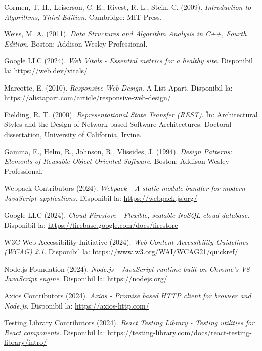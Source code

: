 \documentclass[12pt,a4paper]{report}
\begin{document}
\begin{thebibliography}{20}
Cormen, T. H., Leiserson, C. E., Rivest, R. L., Stein, C. (2009). \textit{Introduction to Algorithms, Third Edition}. Cambridge: MIT Press.

Weiss, M. A. (2011). \textit{Data Structures and Algorithm Analysis in C++, Fourth Edition}. Boston: Addison-Wesley Professional.

Google LLC (2024). \textit{Web Vitals - Essential metrics for a healthy site}. Disponibil la: \url{https://web.dev/vitals/}

Marcotte, E. (2010). \textit{Responsive Web Design}. A List Apart. Disponibil la: \url{https://alistapart.com/article/responsive-web-design/}

Fielding, R. T. (2000). \textit{Representational State Transfer (REST)}. În: Architectural Styles and the Design of Network-based Software Architectures. Doctoral dissertation, University of California, Irvine.

Gamma, E., Helm, R., Johnson, R., Vlissides, J. (1994). \textit{Design Patterns: Elements of Reusable Object-Oriented Software}. Boston: Addison-Wesley Professional.

Webpack Contributors (2024). \textit{Webpack - A static module bundler for modern JavaScript applications}. Disponibil la: \url{https://webpack.js.org/}

Google LLC (2024). \textit{Cloud Firestore - Flexible, scalable NoSQL cloud database}. Disponibil la: \url{https://firebase.google.com/docs/firestore}

W3C Web Accessibility Initiative (2024). \textit{Web Content Accessibility Guidelines (WCAG) 2.1}. Disponibil la: \url{https://www.w3.org/WAI/WCAG21/quickref/}

Node.js Foundation (2024). \textit{Node.js - JavaScript runtime built on Chrome's V8 JavaScript engine}. Disponibil la: \url{https://nodejs.org/}

Axios Contributors (2024). \textit{Axios - Promise based HTTP client for browser and Node.js}. Disponibil la: \url{https://axios-http.com/}

Testing Library Contributors (2024). \textit{React Testing Library - Testing utilities for React components}. Disponibil la: \url{https://testing-library.com/docs/react-testing-library/intro/}


\end{thebibliography}
\end{document}
